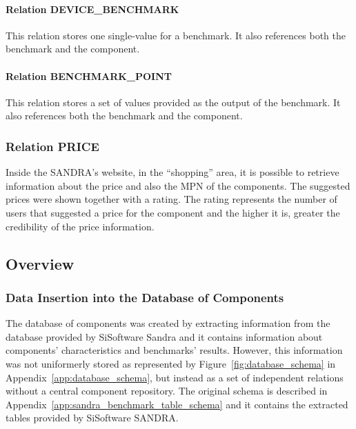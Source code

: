         \paragraph*{Relation DEVICE\_BENCHMARK}
            This relation stores one single-value for a benchmark. It also references both the benchmark and the component.
            
        \paragraph*{Relation BENCHMARK\_POINT}
            This relation stores a set of values provided as the output of the benchmark. It also references both the benchmark and the component.            

    \subsubsection*{Relation PRICE}
        Inside the SANDRA's website, in the ``shopping'' area, it is possible to retrieve information about the price and also the MPN of the components. The suggested prices were shown together with a rating. The rating represents the number of users that suggested a price for the component and the higher it is, greater the credibility of the price information.
                        
\subsection{Overview} \label{sec4:analysis_overview}
    \subsubsection*{Data Insertion into the Database of Components}
        The database of components was created by extracting information from the database provided by SiSoftware Sandra and it contains information about components' characteristics and benchmarks' results. However, this information was not uniformerly stored as represented by Figure~\ref{fig:database_schema} in Appendix~\ref{app:database_schema}, but instead as a set of independent relations without a central component repository. The original schema is described in Appendix~\ref{app:sandra_benchmark_table_schema} and it contains the extracted tables provided by SiSoftware SANDRA.
    
